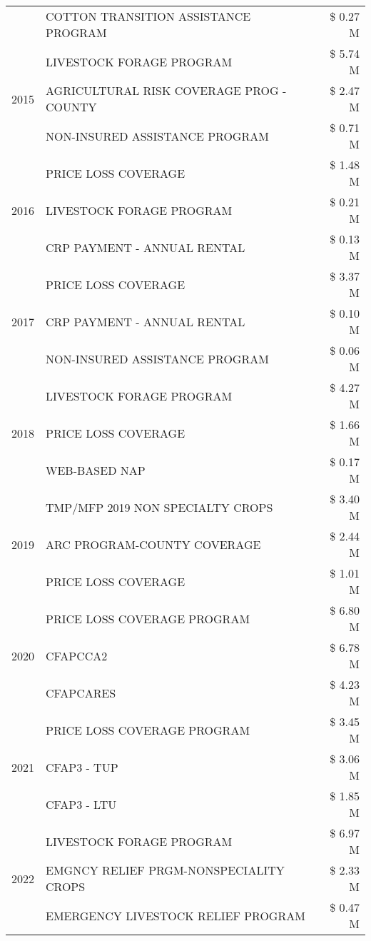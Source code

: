 \begin{tabular}{llr}
 & COTTON TRANSITION ASSISTANCE PROGRAM & \$ 0.27 M \\
\cline{1-3}
\multirow[t]{3}{*}{2015} & LIVESTOCK FORAGE PROGRAM & \$ 5.74 M \\
 & AGRICULTURAL RISK COVERAGE PROG - COUNTY & \$ 2.47 M \\
 & NON-INSURED ASSISTANCE PROGRAM & \$ 0.71 M \\
\cline{1-3}
\multirow[t]{3}{*}{2016} & PRICE LOSS COVERAGE & \$ 1.48 M \\
 & LIVESTOCK FORAGE PROGRAM & \$ 0.21 M \\
 & CRP PAYMENT - ANNUAL RENTAL & \$ 0.13 M \\
\cline{1-3}
\multirow[t]{3}{*}{2017} & PRICE LOSS COVERAGE & \$ 3.37 M \\
 & CRP PAYMENT - ANNUAL RENTAL & \$ 0.10 M \\
 & NON-INSURED ASSISTANCE PROGRAM & \$ 0.06 M \\
\cline{1-3}
\multirow[t]{3}{*}{2018} & LIVESTOCK FORAGE PROGRAM & \$ 4.27 M \\
 & PRICE LOSS COVERAGE & \$ 1.66 M \\
 & WEB-BASED NAP & \$ 0.17 M \\
\cline{1-3}
\multirow[t]{3}{*}{2019} & TMP/MFP 2019 NON SPECIALTY CROPS & \$ 3.40 M \\
 & ARC PROGRAM-COUNTY COVERAGE & \$ 2.44 M \\
 & PRICE LOSS COVERAGE & \$ 1.01 M \\
\cline{1-3}
\multirow[t]{3}{*}{2020} & PRICE LOSS COVERAGE PROGRAM & \$ 6.80 M \\
 & CFAPCCA2 & \$ 6.78 M \\
 & CFAPCARES & \$ 4.23 M \\
\cline{1-3}
\multirow[t]{3}{*}{2021} & PRICE LOSS COVERAGE PROGRAM & \$ 3.45 M \\
 & CFAP3 - TUP & \$ 3.06 M \\
 & CFAP3 - LTU & \$ 1.85 M \\
\cline{1-3}
\multirow[t]{3}{*}{2022} & LIVESTOCK FORAGE PROGRAM & \$ 6.97 M \\
 & EMGNCY RELIEF PRGM-NONSPECIALITY CROPS & \$ 2.33 M \\
 & EMERGENCY LIVESTOCK RELIEF PROGRAM & \$ 0.47 M \\
\cline{1-3}
\bottomrule
\end{tabular}
